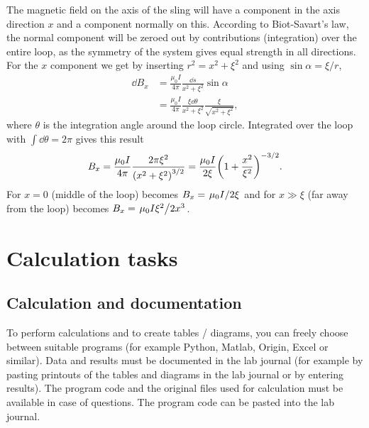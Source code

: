 \documentclass[../Elmag-labhefte-2020.tex]{subfiles}
\begin{document}
The magnetic field on the axis of the sling will have a component in the axis direction $x$ and a component normally on this. According to Biot-Savart's law, the normal component will be zeroed out by contributions (integration) over the entire loop, as the symmetry of the system gives equal strength in all directions. For the $x$ component we get by inserting $r^2 = x^2 + \xi^2$ and using $\sin \alpha = \xi/r$,
%
\begin{align}
    \dd{B_x} &= \frac{\mu_0 I}{4 \pi} \frac{\dd{s}}{x^2 + \xi^2} \sin\alpha \nonumber \\
             &= \frac{\mu_0 I}{4 \pi}  \frac{\xi \dd{\theta}}{x^2 + \xi^2}  \frac{\xi}{\sqrt{x^2 + \xi^2}} ,
\end{align}
where $\theta$ is the integration angle around the loop circle. Integrated over the loop with $\int \dd{\theta} = 2\pi$ gives this result
%
\begin{equation} 
    \label{eq:Biot.Savart3}
    B_x = \frac{\mu_0 I}{4 \pi} \frac{2\pi \xi^2}{\left( x^2 + \xi^2 \right)^{3/2}}
        = \frac{\mu_0 I}{2 \xi} \qty(1 + \frac{x^2}{\xi^2})^{-3/2}.
\end{equation}
For $x = 0$ (middle of the loop) becomes $B_x = \flatfrac{\mu_0 I}{2\xi}$ and for $x \gg \xi$ (far away from the loop) becomes $B_x = \flatfrac{\mu_0 I\xi^2}{2x^3}$.


\section{Calculation tasks \label{ch.magnetfelt.beregn}}

\subsection{Calculation and documentation \label{ch.magnetfelt.regneark}}

To perform calculations and to create tables / diagrams, you can freely choose between suitable programs (for example Python, Matlab, Origin, Excel or similar). Data and results must be documented in the lab journal (for example by pasting printouts of the tables and diagrams in the lab journal or by entering results). The program code and the original files used for calculation must be available in case of questions. The program code can be pasted into the lab journal.
\end{document}
